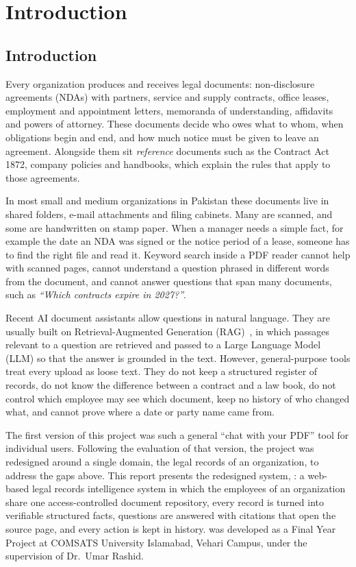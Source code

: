 \chapter{Introduction}

\section{Introduction}
Every organization produces and receives legal documents: non-disclosure agreements (NDAs) with
partners, service and supply contracts, office leases, employment and appointment letters,
memoranda of understanding, affidavits and powers of attorney. These documents decide who owes
what to whom, when obligations begin and end, and how much notice must be given to leave an
agreement. Alongside them sit \emph{reference} documents such as the Contract Act 1872, company
policies and handbooks, which explain the rules that apply to those agreements.

In most small and medium organizations in Pakistan these documents live in shared folders, e-mail
attachments and filing cabinets. Many are scanned, and some are handwritten on stamp paper. When a
manager needs a simple fact, for example the date an NDA was signed or the notice period of a lease,
someone has to find the right file and read it. Keyword search inside a PDF reader cannot help with
scanned pages, cannot understand a question phrased in different words from the document, and
cannot answer questions that span many documents, such as \emph{``Which contracts expire in 2027?''}.

Recent AI document assistants allow questions in natural language. They are usually built on
Retrieval-Augmented Generation (RAG)~\cite{lewis2020rag}, in which passages relevant to a question
are retrieved and passed to a Large Language Model (LLM) so that the answer is grounded in the text.
However, general-purpose tools treat every upload as loose text. They do not keep a structured
register of records, do not know the difference between a contract and a law book, do not control
which employee may see which document, keep no history of who changed what, and cannot prove where
a date or party name came from.

The first version of this project was such a general ``chat with your PDF'' tool for individual
users. Following the evaluation of that version, the project was redesigned around a single domain,
the legal records of an organization, to address the gaps above. This report presents the
redesigned system, \textbf{\sysname{}}: a web-based legal records intelligence system in which the
employees of an organization share one access-controlled document repository, every record is
turned into verifiable structured facts, questions are answered with citations that open the source
page, and every action is kept in history. \sysname{} was developed as a Final Year Project at
COMSATS University Islamabad, Vehari Campus, under the supervision of Dr.\ Umar Rashid.


